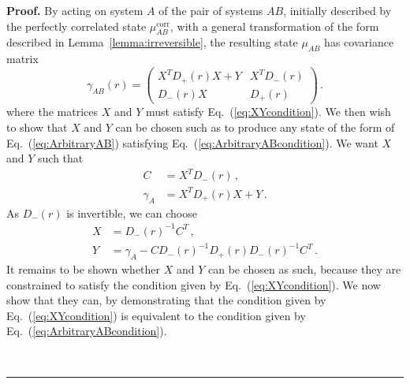 \documentclass[pra,superscriptaddress,nofootinbib,12pt]{revtex4-2}
\newenvironment{proof}[1][Proof]{\noindent\textbf{#1.} }{\ \rule{0.5em}{0.5em}}
\begin{document}
\begin{proof}
By acting on system $A$ of the pair of systems $AB$, initially described by the perfectly correlated state $\mu_{AB}^{\mathrm{corr}}$, with a general transformation of the form described in Lemma~\ref{lemma:irreversible}, the resulting state $\mu_{AB}$ has covariance matrix
\begin{equation}
  \label{eq:CJstateXY}
  \gamma_{AB}(r) = \begin{pmatrix} X^T D_+(r) X + Y & X^T D_-(r) \\ D_-(r)X & D_+(r) \end{pmatrix} \,.
\end{equation}
where the matrices $X$ and $Y$ must satisfy Eq.~(\ref{eq:XYcondition}).  We then wish to show that $X$ and $Y$ can be chosen such as to produce any state of the form of Eq.~(\ref{eq:ArbitraryAB}) satisfying Eq.~(\ref{eq:ArbitraryABcondition}).  We want $X$ and $Y$ such that
\begin{align}
  \label{eq:CfunctXY}
  C &= X^T D_-(r) \,, \\
  \label{eq:gammafunctXY}
  \gamma_{A} &= X^T D_+(r) X + Y \,.
\end{align}
As $D_-(r)$ is invertible, we can choose
\begin{align}
  X &= D_-(r)^{-1} C^T \,, \\
  Y &= \gamma_{A} - C D_-(r)^{-1} D_+(r) D_-(r)^{-1} C^T \,.
\end{align}
It remains to be shown whether $X$ and $Y$ can be chosen as such, because they are constrained to satisfy the condition given by Eq.~(\ref{eq:XYcondition}).  We now show that they can, by demonstrating that the condition given by Eq.~(\ref{eq:XYcondition}) is equivalent to the condition given by Eq.~(\ref{eq:ArbitraryABcondition}).


\end{proof}
\end{document}
